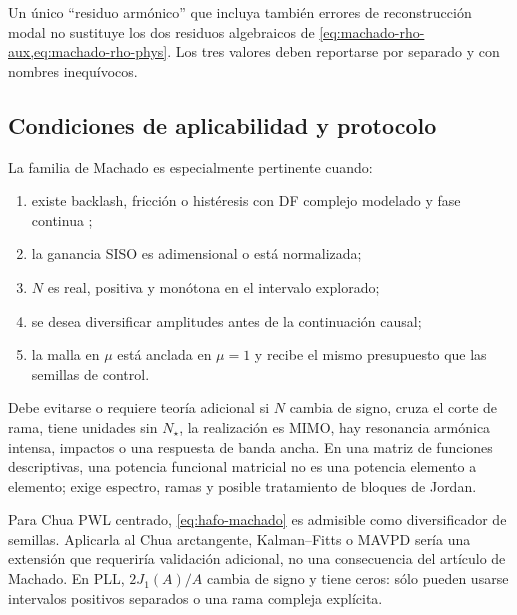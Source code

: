 \begin{warningbox}
Un único ``residuo armónico'' que incluya también errores de reconstrucción
modal no sustituye los dos residuos algebraicos de
\cref{eq:machado-rho-aux,eq:machado-rho-phys}. Los tres valores deben
reportarse por separado y con nombres inequívocos.
\end{warningbox}

\subsection{Condiciones de aplicabilidad y protocolo}

La familia de Machado es especialmente pertinente cuando:
\begin{enumerate}
 \item existe backlash, fricción o histéresis con DF complejo modelado y fase
       continua \cite{DuarteMachado2009Coulomb,Machado2015FDF};
 \item la ganancia SISO es adimensional o está normalizada;
 \item \(N\) es real, positiva y monótona en el intervalo explorado;
 \item se desea diversificar amplitudes antes de la continuación causal;
 \item la malla en \(\mu\) está anclada en \(\mu=1\) y recibe el mismo
       presupuesto que las semillas de control.
\end{enumerate}
Debe evitarse o requiere teoría adicional si \(N\) cambia de signo, cruza el
corte de rama, tiene unidades sin \(N_\star\), la realización es MIMO, hay
resonancia armónica intensa, impactos o una respuesta de banda ancha. En una
matriz de funciones descriptivas, una potencia funcional matricial no es una
potencia elemento a elemento; exige espectro, ramas y posible tratamiento de
bloques de Jordan.

Para Chua PWL centrado, \cref{eq:hafo-machado} es admisible como diversificador
de semillas. Aplicarla al Chua arctangente, Kalman--Fitts o MAVPD sería una
extensión que requeriría validación adicional, no una consecuencia del artículo
de Machado. En PLL, \(2J_1(A)/A\) cambia de signo y tiene ceros: sólo pueden
usarse intervalos positivos separados o una rama compleja explícita.

